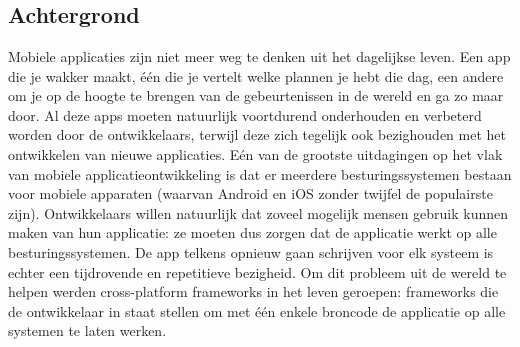 
\chapter{}
\label{ch:inleiding}

%

\section{Achtergrond}
\label{sec:achtergrond}

Mobiele applicaties zijn niet meer weg te denken uit het dagelijkse leven. Een
app die je wakker maakt, één die je vertelt welke plannen je hebt die dag, een
andere om je op de hoogte te brengen van de gebeurtenissen in de wereld en ga zo
maar door. Al deze apps moeten natuurlijk voortdurend onderhouden en verbeterd
worden door de ontwikkelaars, terwijl deze zich tegelijk ook bezighouden met
het ontwikkelen van nieuwe applicaties. Eén van de grootste uitdagingen op het
vlak van mobiele applicatieontwikkeling is dat er meerdere besturingssystemen
bestaan voor mobiele apparaten (waarvan Android en iOS zonder twijfel de
populairste zijn). Ontwikkelaars willen natuurlijk dat zoveel mogelijk mensen
gebruik kunnen maken van hun applicatie: ze moeten dus zorgen dat de applicatie
werkt op alle besturingssystemen. De app telkens opnieuw gaan schrijven voor elk
systeem is echter een tijdrovende en repetitieve bezigheid. Om dit probleem uit
de wereld te helpen werden cross-platform frameworks in het leven geroepen:
frameworks die de ontwikkelaar in staat stellen om met één enkele broncode de
applicatie op alle systemen te laten werken.

